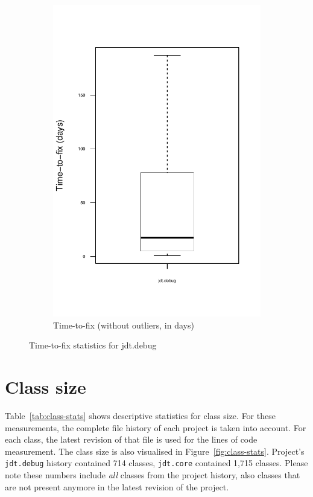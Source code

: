 \begin{figure}
\begin{subfigure}[b]{0.48\textwidth}
                \includegraphics[width=\textwidth]{img/ttf-zoomed.pdf}
                \caption{Time-to-fix (without outliers, in days)}
        \end{subfigure}
		\caption{Time-to-fix statistics for jdt.debug}
		\label{fig:ttf-stats}
\end{figure}


\section{Class size} %
\label{sec:class_size}
Table~\ref{tab:class-stats} shows descriptive statistics for class size. For these measurements, the complete file history of each project is taken into account. For each class, the latest revision of that file is used for the lines of code measurement. The class size is also visualised in Figure~\ref{fig:class-stats}. Project's \texttt{jdt.debug} history contained 714 classes, \texttt{jdt.core} contained 1,715 classes. Please note these numbers include \emph{all} classes from the project history, also classes that are not present anymore in the latest revision of the project.

